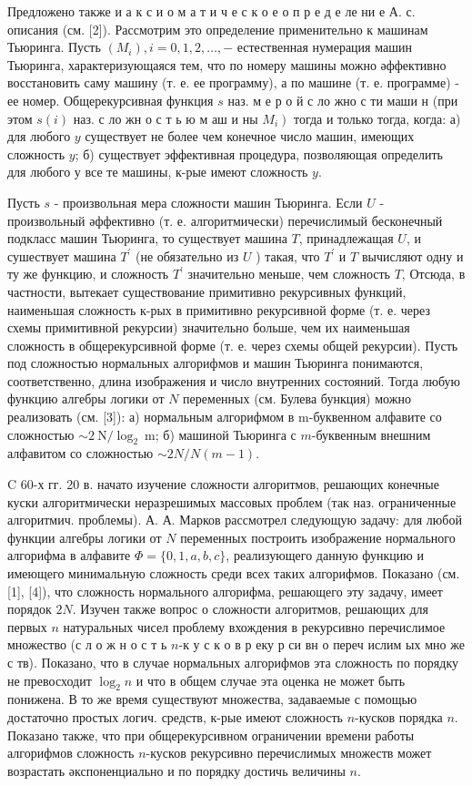 \documentclass[10pt]{article}
\begin{document}
Предложено также и а к с и о м а т и ч е с к о е о п р е д е ле ни е А. с. описания (см. [2]). Рассмотрим это определение применительно к машинам Тьюринга. Пусть $\left(M_{i}\right), i=0,1,2, \ldots,-$ естественная нумерация машин Тьюринга, характеризующаяся тем, что по номеру машины можно әффективно восстановить саму машину (т. е. ее программу), а по машине (т. е. программе) - ее номер. Общерекурсивная функция $s$ наз. м е р о й с ло жно с ти маши н (при этом $s(i)$ наз. с ло жн о с т ь ю м аш и ны $\left.M_{i}\right)$ тогда и только тогда, когда: а) для любого $y$ существует не более чем конечное число машин, имеющих сложность $y$; б) существует эффективная процедура, позволяющая определить для любого $у$ все те машины, к-рые имеют сложность $y$.



Пусть $s$ - произвольная мера сложности машин Тьюринга. Если $U$ - произвольный әффективно (т. е. алгоритмически) перечислимый бесконечный подкласс машин Тьюринга, то существует машина $T$, принадлежащая $U$, и сушествует машина $T^{\prime}$ (не обязательно из $U$ ) такая, что $T^{\prime}$ и $T$ вычисляют одну и ту же функцию, и сложность $T^{\prime}$ значительно меньше, чем сложность $T$, Отсюда, в частности, вытекает существование примитивно рекурсивных функций, наименьшая сложность к-рых в примитивно рекурсивной форме (т. е. через схемы примитивной рекурсии) значительно больше, чем их наименьшая сложность в общерекурсивной форме (т. е. через схемы общей рекурсии). Пусть под сложностью нормальных алгорифмов и машин Тьюринга понимаются, соответственно, длина изображения и число внутренних состояний. Тогда любую функцию алгебры логики от $N$ переменных (см. Булева бункция) можно реализовать (см. [3]): а) нормальным алгорифмом в m-буквенном алфавите со сложностью $\sim 2 \mathrm{~N} / \log _{2} \mathrm{~m}$; б) машиной Тьюринга с $m$-буквенным внешним алфавитом со сложностью $\sim 2 N / N(m-1)$.



C 60-х гг. 20 в. начато изучение сложности алгоритмов, решающих конечные куски алгоритмически неразрешимых массовых проблем (так наз. ограниченные алгоритмич. проблемы). А. А. Марков рассмотрел следующую задачу: для любой функции алгебры логики от $N$ переменных построить изображение нормального алгорифма в алфавите $\Phi=\{0,1, a, b, c\}$, реализующего данную функцию и имеющего минимальную сложность среди всех таких алгорифмов. Показано (см. [1], [4]), что сложность нормального алгорифма, решающего эту задачу, имеет порядок $2 N$. Изучен также вопрос о сложности алгоритмов, решающих для первых $n$ натуральных чисел проблему вхождения в рекурсивно перечислимое множество (с л о ж н о с т ь $n$-к у с к о в р еку р си вн о переч ислим ых мно же с тв). Показано, что в случае нормальных алгорифмов эта сложность по порядку не превосходит $\log _{2} n$ и что в общем случае эта оценка не может быть понижена. В то же время существуют множества, задаваемые с помощью достаточно простых логич. средств, к-рые имеют сложность $n$-кусков порядка $n$. Показано также, что при общерекурсивном ограничении времени работы алгорифмов сложность $n$-кусков рекурсивно перечислимых множеств может возрастать әкспоненциально и по порядку достичь величины $n$.
\end{document}
